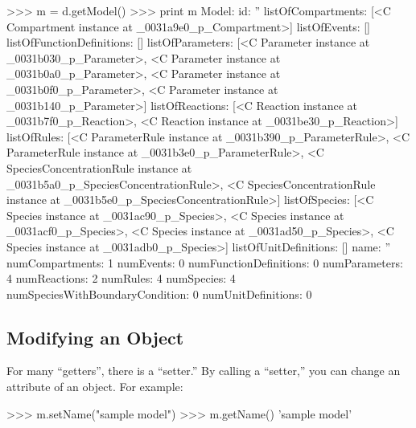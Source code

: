 \documentclass{sbmlmanual}
\begin{document}
\begin{shellVerbatim}
>>> m = d.getModel()
>>> print m
Model:
   id:                               ''
   listOfCompartments:               [<C Compartment instance at _0031a9e0_p_Compartment>]
   listOfEvents:                     []
   listOfFunctionDefinitions:        []
   listOfParameters:                 [<C Parameter instance at _0031b030_p_Parameter>, <C Parameter instance at _0031b0a0_p_Parameter>, <C Parameter instance at _0031b0f0_p_Parameter>, <C Parameter instance at _0031b140_p_Parameter>]
   listOfReactions:                  [<C Reaction instance at _0031b7f0_p_Reaction>, <C Reaction instance at _0031be30_p_Reaction>]
   listOfRules:                      [<C ParameterRule instance at _0031b390_p_ParameterRule>, <C ParameterRule instance at _0031b3e0_p_ParameterRule>, <C SpeciesConcentrationRule instance at _0031b5a0_p_SpeciesConcentrationRule>, <C SpeciesConcentrationRule instance at _0031b5e0_p_SpeciesConcentrationRule>]
   listOfSpecies:                    [<C Species instance at _0031ac90_p_Species>, <C Species instance at _0031acf0_p_Species>, <C Species instance at _0031ad50_p_Species>, <C Species instance at _0031adb0_p_Species>]
   listOfUnitDefinitions:            []
   name:                             ''
   numCompartments:                  1
   numEvents:                        0
   numFunctionDefinitions:           0
   numParameters:                    4
   numReactions:                     2
   numRules:                         4
   numSpecies:                       4
   numSpeciesWithBoundaryCondition:  0
   numUnitDefinitions:               0
\end{shellVerbatim}


\subsection{Modifying an  Object}
\label{sec:python-interactive}

For many ``getters'', there is a ``setter.''  By calling a
``setter,'' you can change an attribute of an  object.
For example:

\begin{shellVerbatim}
>>> m.setName("sample model")
>>> m.getName()
'sample model'
\end{shellVerbatim}
\end{document}
